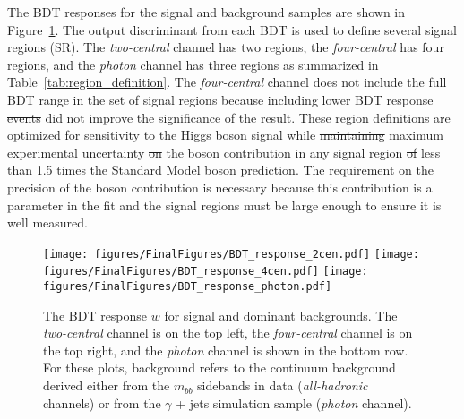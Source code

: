 \documentclass[PAPER, american,coverpage,texlive=2016, english]{\ATLASLATEXPATH atlasdoc}
\providecommand{\DIFadd}[1]{{\protect\color{blue}\uwave{#1}}} %
\providecommand{\DIFdel}[1]{{\protect\color{red}\sout{#1}}}                      %
\providecommand{\DIFaddbegin}{} %
\providecommand{\DIFaddend}{} %
\providecommand{\DIFdelbegin}{} %
\providecommand{\DIFdelend}{} %
\providecommand{\DIFaddFL}[1]{\DIFadd{#1}} %
\providecommand{\DIFaddbeginFL}{} %
\providecommand{\DIFaddendFL}{} %
\providecommand{\DIFdelbeginFL}{} %
\providecommand{\DIFdelendFL}{} %
\begin{document}
The BDT responses for the signal and background samples are shown in Figure~\ref{fig:bdt_output_comparison}. 
The output discriminant from each BDT is used to define several signal regions (SR).  The \textit{two-central} channel has two regions, the \textit{four-central} has four regions, and the \textit{photon} channel has three regions as summarized in Table~\ref{tab:region_definition}.  The \textit{four-central} channel does not include the full BDT range in the set of signal regions because including \DIFaddbegin \DIFadd{events with }\DIFaddend lower BDT response \DIFdelbegin \DIFdel{events }\DIFdelend did not improve the significance of the result.  
These region definitions are optimized for sensitivity to the Higgs boson signal while \DIFdelbegin \DIFdel{maintaining }\DIFdelend \DIFaddbegin \DIFadd{limiting the }\DIFaddend maximum experimental uncertainty \DIFdelbegin \DIFdel{on }\DIFdelend \DIFaddbegin \DIFadd{of }\DIFaddend the \Zboson boson contribution in any signal region \DIFdelbegin \DIFdel{of }\DIFdelend \DIFaddbegin \DIFadd{to }\DIFaddend less than 1.5 times the Standard Model \Zboson boson prediction. The requirement on the precision of the \Zboson boson contribution is necessary because this contribution is a parameter in the fit and the signal regions must be large enough to ensure it is well measured.  


\begin{figure}[htbp]
\centering
\DIFdelbeginFL %
\DIFdelendFL \DIFaddbeginFL \texttt{[image: figures/FinalFigures/BDT\_response\_2cen.pdf]}
\texttt{[image: figures/FinalFigures/BDT\_response\_4cen.pdf]}
\texttt{[image: figures/FinalFigures/BDT\_response\_photon.pdf]}
\DIFaddendFL \caption{The BDT response $w$ for \DIFaddbeginFL \DIFaddFL{the }\DIFaddendFL signal and dominant backgrounds.  The \textit{two-central} channel is on the top left, the \textit{four-central} channel is on the top right, and the \textit{photon} channel is shown in the bottom row.
For these plots, \DIFaddbeginFL \DIFaddFL{the }\DIFaddendFL background refers to the continuum background derived either from the $m_{bb}$ sidebands in data (\textit{all-hadronic} channels) or from the $\gamma$ + jets simulation sample (\textit{photon} channel).  }
\label{fig:bdt_output_comparison}
\end{figure}
\end{document}
